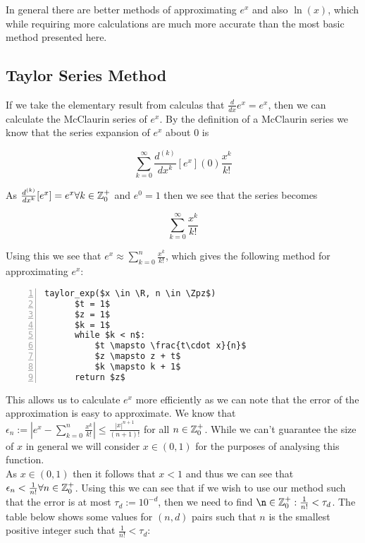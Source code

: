 In general there are better methods of approximating \(e^x\) and also \(\ln(x)\), which while requiring more calculations are much more accurate than the most basic method presented here.

\subsection{Taylor Series Method}

\theoremstyle{plain}
\newtheorem{nat log dif}{Proposition}[subsection]
\newtheorem{log convergence}[nat log dif]{Proposition}

If we take the elementary result from calculas that \(\frac{d}{dx}e^x = e^x\), then we can calculate the McClaurin series of \(e^x\). By the definition of a McClaurin series we know that the series expansion of \(e^x\) about 0 is 

\[\sum_{k=0}^\infty \frac{d^{(k)}}{dx^k}[e^x](0)\frac{x^k}{k!}\]

As \(\frac{d^{(k)}}{dx^k}[e^x] = e^x \forall k \in \mathbb{Z}^+_0\) and \(e^0 = 1\) then we see that the series becomes

\[\sum_{k=0}^\infty \frac{x^k}{k!}\]

Using this we see that \(e^x \approx \sum_{k=0}^n \frac{x^k}{k!}\), which gives the following method for approximating \(e^x\):

\begin{lstlisting}[numbers=left,frame=single,mathescape,caption={Taylor Method for calculating \(e^x\)},label={PCD_"taylor exp"}]
  taylor_exp($x \in \R, n \in \Zpz$)
      $t = 1$
      $z = 1$
      $k = 1$
      while $k < n$:
          $t \mapsto \frac{t\cdot x}{n}$
          $z \mapsto z + t$
          $k \mapsto k + 1$
      return $z$
\end{lstlisting}

This allows us to calculate \(e^x\) more efficiently as we can note that the error of the approximation is easy to approximate. We know that \(\epsilon_n := |e^x - \sum_{k=0}^n\frac{x^k}{k!}| \le \frac{|x|^{n+1}}{(n+1)!}\) for all \(n \in \mathbb{Z}^+_0\). While we can't guarantee the size of \(x\) in general we will consider \(x \in (0,1)\) for the purposes of analysing this function.\\

As \(x \in (0,1)\) then it follows that \(x < 1\) and thus we can see that \(\epsilon_n < \frac{1}{n!} \forall n \in \mathbb{Z}^+_0\). Using this we can see that if we wish to use our method such that the error is at most \(\tau_d := 10^{-d}\), then we need to find \(\n \in \Zpz : \frac{1}{n!} < \tau_d\). The table below shows some values for \((n, d)\) pairs such that \(n\) is the smallest positive integer such that \(\frac{1}{n!} < \tau_d\):

